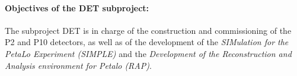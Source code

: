 \paragraph{Objectives of the DET subproject:}

The subproject DET is in charge of the construction and commissioning of the P2 and P10 detectors, as well as of the development of the {\em SIMulation for the PetaLo Experiment (SIMPLE)} and the {\em Development of the Reconstruction and Analysis environment for Petalo (RAP)}. 

%
%
%
%

